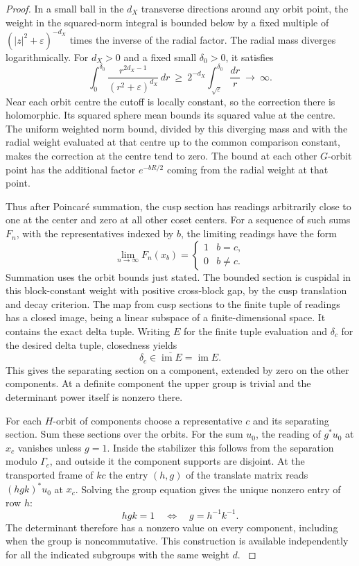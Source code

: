 \begin{proof}
In a small ball in the $d_X$ transverse
directions around any orbit point, the weight in the squared-norm integral
is bounded below by a fixed multiple of
$(|z|^2+\varepsilon)^{-d_X}$ times the inverse of the radial
factor. The radial mass diverges logarithmically. For \(d_X>0\) and
a fixed small \(\delta_0>0\), it satisfies
\[
 \int_0^{\delta_0}\frac{r^{2d_X-1}}{(r^2+\varepsilon)^{d_X}}\,dr
    \ \ge\ 2^{-d_X}\int_{\sqrt\varepsilon}^{\delta_0}\frac{dr}{r}
    \ \longrightarrow\ \infty .
\]
Near each orbit centre the cutoff is locally constant, so the
correction there is holomorphic. Its squared sphere mean bounds
its squared value at the centre. The uniform weighted norm bound,
divided by this diverging mass and with the radial weight evaluated
at that centre up to the common comparison constant, makes the
correction at the centre tend to zero. The
bound at each other $G$-orbit point has the additional factor
$e^{-bR/2}$ coming from the radial weight at that point.

Thus after
Poincar\'e summation, the cusp section has readings arbitrarily close
to one at the center and zero at all other coset centers.
For a sequence of such sums \(F_n\), with the representatives indexed by \(b\), the limiting readings have the form
\[
  \lim_{n\to\infty}F_n(x_b)=\begin{cases}1&b=c,\\0&b\ne c.\end{cases}
\]
 Summation
uses the orbit bounds just stated. The bounded section is cuspidal
in this block-constant weight with positive cross-block gap, by the
cusp translation and decay criterion. The map from cusp sections
to the finite tuple of readings has a closed image, being a linear
subspace of a finite-dimensional space. It contains the exact delta
tuple.
Writing \(E\) for the finite tuple evaluation and \(\delta_c\) for the desired delta tuple, closedness yields
\[
  \delta_c\in\overline{\operatorname{im}E}=\operatorname{im}E .
\]
 This gives the separating section on a component, extended by
zero on the other components. At a definite component the upper
group is trivial and the determinant power itself is nonzero there.
\cite{hormander-slice}\label{cor:paired-cusp-ranks-5}

For each $H$-orbit of components choose a representative $c$ and
its separating section. Sum these sections over the orbits. For the
sum $u_0$, the reading of $g^*u_0$ at $x_c$ vanishes unless $g=1$.
Inside the stabilizer this follows from the separation modulo
$\Gamma_c$, and outside it the component supports are disjoint.
At the transported frame of $kc$ the entry $(h,g)$ of the translate
matrix reads $(hgk)^*u_0$ at $x_c$. Solving the group equation gives the unique nonzero entry of row \(h\):
\[
  hgk=1\quad\Longleftrightarrow\quad g=h^{-1}k^{-1}.
\]
 The determinant therefore has a
nonzero value on every component, including when the group is
noncommutative. This construction is available independently for
all the indicated subgroups with the same weight $d$.
\label{cor:paired-cusp-ranks-6}

\end{proof}

